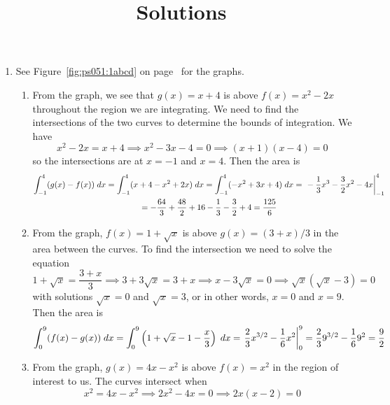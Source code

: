 \documentclass{article}
\title{\commonPSTitleZeroFiveOne\ Solutions}
\author{\commonAuthor}
\date{\commonDateZeroFiveOne}
\begin{document}
\maketitle
\begin{enumerate}
\item See Figure~\ref{fig:ps051:1abcd} on
  page~\pageref{fig:ps051:1abcd} for the graphs.
  \begin{enumerate}
  \item From the graph, we see that $g(x)=x+4$ is above $f(x)=x^2-2x$
    throughout the region we are integrating.  We need to find the
    intersections of the two curves to determine the bounds of
    integration.  We have
    \begin{equation*}
      x^2-2x=x+4 \implies x^2-3x-4 = 0 \implies (x+1)(x-4) = 0
    \end{equation*}
    so the intersections are at $x=-1$ and $x=4$.  Then the area is
    \begin{multline*}
      \int_{-1}^4 (g(x)-f(x)) \; dx
      = \int_{-1}^4 (x+4-x^2+2x) \; dx
      = \int_{-1}^4 (-x^2+3x+4) \; dx
      = \left. \vphantom{\int} -\frac{1}{3} x^3 - \frac{3}{2} x^2 - 4x
      \right|_{-1}^4
      \\
      = -\frac{64}{3} + \frac{48}{2} + 16 - \frac{1}{3} - \frac{3}{2}
      + 4
      = \frac{125}{6}
    \end{multline*}
  \item From the graph, $f(x)=1+\sqrt{x}$ is above $g(x)=(3+x)/3$ in
    the area between the curves.  To find the intersection we need to
    solve the equation
    \begin{equation*}
      1+\sqrt{x} = \frac{3+x}{3} \implies 3 + 3\sqrt{x} = 3 + x
      \implies x - 3\sqrt{x} = 0 \implies \sqrt{x}(\sqrt{x} - 3) =0
    \end{equation*}
    with solutions $\sqrt{x}=0$ and $\sqrt{x}=3$, or in other words,
    $x=0$ and $x=9$.  Then the area is
    \begin{equation*}
      \int_0^9 (f(x)-g(x)) \; dx
      = \int_0^9 \left(1+\sqrt{x} - 1 - \frac{x}{3}\right) \; dx
      = \left. \vphantom{\int} \frac{2}{3} x^{3/2} - \frac{1}{6} x^2
      \right|_0^9
      = \frac{2}{3} 9^{3/2} - \frac{1}{6} 9^2
      = \frac{9}{2}
    \end{equation*}
  \item From the graph, $g(x)=4x-x^2$ is above $f(x)=x^2$ in the
    region of interest to us.  The curves intersect when
    \begin{equation*}
      x^2 = 4x - x^2 \implies 2x^2 - 4x = 0 \implies 2x(x-2) = 0

\end{equation*}
\end{enumerate}
\end{enumerate}
\end{document}
